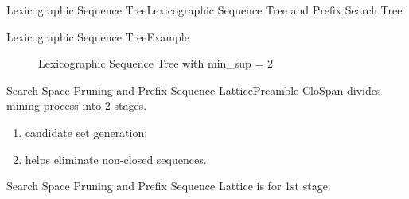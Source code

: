 \documentclass[12pt]{beamer}
\begin{document}
\begin{frame}{Lexicographic Sequence Tree}{Lexicographic Sequence Tree and Prefix Search Tree}
\end{frame}

\begin{frame}{Lexicographic Sequence Tree}{Example}\label{D-sample}
\begin{figure}
\caption*{Lexicographic Sequence Tree with min\_sup = 2}
\end{figure}
\end{frame}

\begin{frame}{Search Space Pruning and Prefix Sequence Lattice}{Preamble}
	CloSpan divides mining process into 2 stages.
	\begin{enumerate}
	\item candidate set generation;
	\item helps eliminate non-closed sequences.
	\end{enumerate}
	Search Space Pruning and Prefix Sequence Lattice is for 1st  stage.
\end{frame}
\end{document}

